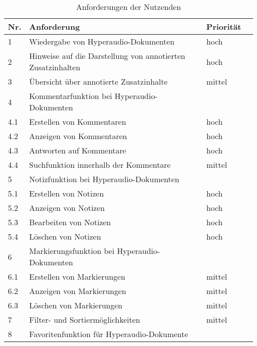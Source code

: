 \begin{table}[!ht]
\def\arraystretch{1.4}
\caption{Anforderungen der Nutzenden}
\label{tab:AnforderungenNutzenden}
\begin{tabularx}{\textwidth}{lXll}      
    \hline
    Nr. & Anforderung & Priorität
    \\\hline
    1 & Wiedergabe von Hyperaudio-Dokumenten & hoch\\
    2 & Hinweise auf die Darstellung von annotierten Zusatzinhalten & hoch\\
    3 & Übersicht über annotierte Zusatzinhalte & mittel\\
    4 & Kommentarfunktion bei Hyperaudio-Dokumenten & \\
    4.1 & \hspace*{0.5cm} Erstellen von Kommentaren & hoch\\
    4.2 & \hspace*{0.5cm} Anzeigen von Kommentaren & hoch\\
    4.3 & \hspace*{0.5cm} Antworten auf Kommentare & hoch\\
    4.4 & \hspace*{0.5cm} Suchfunktion innerhalb der Kommentare & mittel\\ 
    5 & Notizfunktion bei Hyperaudio-Dokumenten & \\
    5.1 & \hspace*{0.5cm} Erstellen von Notizen & hoch\\
    5.2 & \hspace*{0.5cm} Anzeigen von Notizen & hoch\\
    5.3 & \hspace*{0.5cm} Bearbeiten von Notizen & hoch\\
   	5.4 & \hspace*{0.5cm} Löschen von Notizen & hoch\\
    6 & Markierungsfunktion bei Hyperaudio-Dokumenten & \\
    6.1 & \hspace*{0.5cm} Erstellen von Markierungen & mittel\\
    6.2 & \hspace*{0.5cm} Anzeigen von Markierungen & mittel\\
   	6.3 & \hspace*{0.5cm} Löschen von Markierungen & mittel\\
   	7 & Filter- und Sortiermöglichkeiten & mittel\\
    8 & Favoritenfunktion für Hyperaudio-Dokumente & \\

\end{tabularx}
\end{table}
